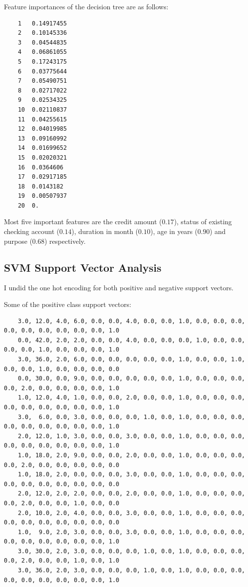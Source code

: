 \documentclass[12pt,a4paper, margin=1in]{article}
\begin{document}
Feature importances of the decision tree are as follows:

\begin{small}
\begin{verbatim}
    1   0.14917455 
    2   0.10145336 
    3   0.04544835 
    4   0.06861055 
    5   0.17243175 
    6   0.03775644
    7   0.05490751 
    8   0.02717022 
    9   0.02534325 
    10  0.02110837 
    11  0.04255615 
    12  0.04019985
    13  0.09160992 
    14  0.01699652 
    15  0.02020321 
    16  0.0364606  
    17  0.02917185 
    18  0.0143182
    19  0.00507937 
    20  0.        
\end{verbatim}
\end{small}

Most five important features are the credit amount ($0.17$), status of existing checking account ($0.14$), duration in month ($0.10$), age in years ($0.90$) and purpose ($0.68$) respectively.

\subsection{SVM Support Vector Analysis}
I undid the one hot encoding for both positive and negative support vectors.
\bigskip

Some of the positive class support vectors:
\begin{footnotesize}
\begin{verbatim}
    3.0, 12.0, 4.0, 6.0, 0.0, 0.0, 4.0, 0.0, 0.0, 1.0, 0.0, 0.0, 0.0, 0.0, 0.0, 0.0, 0.0, 0.0, 0.0, 1.0
    0.0, 42.0, 2.0, 2.0, 0.0, 0.0, 4.0, 0.0, 0.0, 0.0, 1.0, 0.0, 0.0, 0.0, 0.0, 1.0, 0.0, 0.0, 0.0, 1.0
    3.0, 36.0, 2.0, 6.0, 0.0, 0.0, 0.0, 0.0, 0.0, 1.0, 0.0, 0.0, 1.0, 0.0, 0.0, 1.0, 0.0, 0.0, 0.0, 0.0
    0.0, 30.0, 0.0, 9.0, 0.0, 0.0, 0.0, 0.0, 0.0, 1.0, 0.0, 0.0, 0.0, 0.0, 2.0, 0.0, 0.0, 0.0, 0.0, 1.0
    1.0, 12.0, 4.0, 1.0, 0.0, 0.0, 2.0, 0.0, 0.0, 1.0, 0.0, 0.0, 0.0, 0.0, 0.0, 0.0, 0.0, 0.0, 0.0, 1.0
    3.0,  6.0, 0.0, 3.0, 0.0, 0.0, 0.0, 1.0, 0.0, 1.0, 0.0, 0.0, 0.0, 0.0, 0.0, 0.0, 0.0, 0.0, 0.0, 1.0
    2.0, 12.0, 1.0, 3.0, 0.0, 0.0, 3.0, 0.0, 0.0, 1.0, 0.0, 0.0, 0.0, 0.0, 0.0, 0.0, 0.0, 0.0, 0.0, 1.0
    1.0, 18.0, 2.0, 9.0, 0.0, 0.0, 2.0, 0.0, 0.0, 1.0, 0.0, 0.0, 0.0, 0.0, 2.0, 0.0, 0.0, 0.0, 0.0, 0.0
    1.0, 18.0, 2.0, 0.0, 0.0, 0.0, 3.0, 0.0, 0.0, 1.0, 0.0, 0.0, 0.0, 0.0, 0.0, 0.0, 0.0, 0.0, 0.0, 0.0
    2.0, 12.0, 2.0, 2.0, 0.0, 0.0, 2.0, 0.0, 0.0, 1.0, 0.0, 0.0, 0.0, 0.0, 2.0, 0.0, 0.0, 1.0, 0.0, 0.0
    2.0, 10.0, 2.0, 4.0, 0.0, 0.0, 3.0, 0.0, 0.0, 1.0, 0.0, 0.0, 0.0, 0.0, 0.0, 0.0, 0.0, 0.0, 0.0, 0.0
    1.0,  9.0, 2.0, 3.0, 0.0, 0.0, 3.0, 0.0, 0.0, 1.0, 0.0, 0.0, 0.0, 0.0, 0.0, 0.0, 0.0, 0.0, 0.0, 1.0
    3.0, 30.0, 2.0, 3.0, 0.0, 0.0, 0.0, 1.0, 0.0, 1.0, 0.0, 0.0, 0.0, 0.0, 2.0, 0.0, 0.0, 1.0, 0.0, 1.0
    3.0, 36.0, 2.0, 3.0, 0.0, 0.0, 0.0, 1.0, 0.0, 1.0, 0.0, 0.0, 0.0, 0.0, 0.0, 0.0, 0.0, 0.0, 0.0, 1.0
    
\end{verbatim}
\end{footnotesize}
\end{document}
